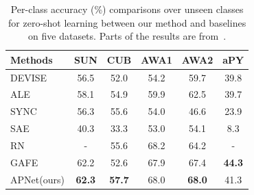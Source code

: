 \documentclass[letterpaper]{article} %
\begin{document}
\begin{table}[t!]
\centering
\caption{Per-class accuracy (\%) comparisons over unseen classes for zero-shot learning between our method and baselines on five datasets. Parts of the results are from~\cite{xian2018zero}.
}
\begin{tabular}{l|c|c|c|c|c}
\toprule
\textbf{Methods}    & \textbf{SUN}  & \textbf{CUB} & \textbf{AWA1} & \textbf{AWA2} & \textbf{aPY}\\ 
\midrule
DEVISE~\cite{frome2013devise}  & 56.5 & 52.0 & 54.2 & 59.7 & 39.8 \\
ALE~\cite{akata2015label} & 58.1 & 54.9 & 59.9 & 62.5 & 39.7 \\
SYNC~\cite{changpinyo2016synthesized} & 56.3 & 55.6 & 54.0 & 46.6 & 23.9 \\
SAE~\cite{kodirov2017semantic} & 40.3 & 33.3 & 53.0 & 54.1 & 8.3  \\
RN~\cite{sung2018learning} & - & 55.6 & 68.2 & 64.2 & - \\
GAFE~\cite{ijcai2019-graph-auto} & 62.2 & 52.6 & 67.9 & 67.4 & \textbf{44.3} \\
\midrule
APNet(ours) & \textbf{62.3} & \textbf{57.7}  & 68.0  & \textbf{68.0} &  41.3 \\
\bottomrule
\end{tabular}
\label{table:results-zs}
\end{table}
\end{document}
